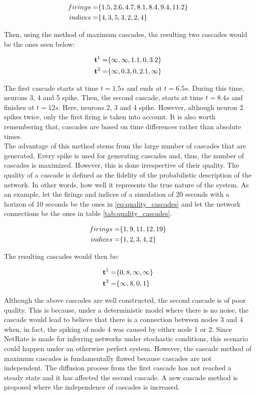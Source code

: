 \begin{align}
	\centering
	firings = &\{1.5, 2.6, 4.7, 8.1, 8.4, 9.4, 11.2\}\\
	indices = &\{4,  3,  5,  3,  2,  2, 4\}
\end{align}

Then, using the method of maximum cascades, the resulting two cascades would be the ones seen below:

\begin{align}
	\centering
	\textbf{t}^{1} = &\{\infty, \infty, 1.1, 0, 3.2 \}\\
	\textbf{t}^{2} = &\{\infty, 0.3, 0, 2.1, \infty \}
\end{align}

The first cascade starts at time \(t=1.5s\) and ends at \(t=6.5s\). During this time, neurons 3, 4 and 5 spike. Then, the second cascade, starts at time \(t=8.4s\) and finishes at \(t=12s\). Here, neurons 2, 3 and 4 spike. However, although neuron 2 spikes twice, only the first firing is taken into account. It is also worth remembering that, cascades are based on time differences rather than absolute times. \\

The advantage of this method stems from the large number of cascades that are generated. Every spike is used for generating cascades and, thus, the number of cascades is maximized. However, this is done irrespective of their quality. The quality of a cascade is defined as the fidelity of the probabilistic description of the network. In other words, how well it represents the true nature of the system. As an example, let the firings and indices of a simulation of 20 seconds with a horizon of 10 seconds be the ones in \ref{eq:quality_cascades} and let the network connections be the ones in table \ref{tab:quality_cascades}.

\begin{align}
	\centering
	firings = &\{1, 9, 11, 12, 19\}\\
	indices = &\{1, 2,  3,  4, 2\}
	\label{eq:quality_cascades}
\end{align}

The resulting cascades would then be:

\begin{align}
	\centering
	\textbf{t}^{1} = &\{0, 8, \infty, \infty \}\\
	\textbf{t}^{2} = &\{\infty, 8, 0, 1 \}
\end{align}

Although the above cascades are well constructed, the second cascade is of poor quality. This is because, under a deterministic model where there is no noise, the cascade would lead to believe that there is a connection between nodes 3 and 4 when, in fact, the spiking of node 4 was caused by either node 1 or 2. Since NetRate is made for inferring networks under stochastic conditions, this scenario could happen under an otherwise perfect system. However, the cascade method of maximum cascades is fundamentally flawed because cascades are not independent. The diffusion process from the first cascade has not reached a steady state and it has affected the second cascade. A new cascade method is proposed where the independence of cascades is increased. 

